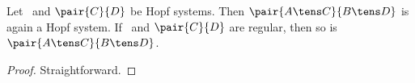 \begin{lemma_sec}
Let\/ \pairAB\ and\/ $\pair{C}{D}$ be Hopf systems. Then\/ $\pair{A \tens C}{B
\tens D}$ is again a Hopf system. If\/ \pairAB\ and\/ $\pair{C}{D}$ are
regular, then so is\/ $\pair{A \tens C}{B \tens D}$.
\end{lemma_sec}
\begin{proof}
Straightforward.
\end{proof}
